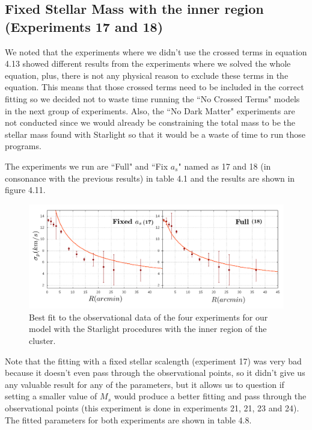 \subsection{Fixed Stellar Mass with the inner region (Experiments 17 and 18)}

We noted that the experiments where we didn't use the crossed terms in equation 4.13 showed different results from the experiments where we solved the whole equation, plus, there is not any physical reason to exclude these terms in the equation. This means that those crossed terms need to be included in the correct fitting so we decided not to waste time running the ``No Crossed Terms" models in the next group of experiments. Also, the ``No Dark Matter" experiments are not conducted since we would already be constraining the total mass to be the stellar mass found with Starlight so that it would be a waste of time to run those programs.

The experiments we run are ``Full" and ``Fix $a_s$" named as 17 and 18 (in consonance with the previous results) in table 4.1 and the results are shown in figure 4.11.

\begin{figure}[H]
\centering
\includegraphics[width=15cm]{images/Starlight_2.png}
\caption[Best fit of our model with the mass found with the Starlight procedures with the inner region]{Best fit to the observational data of the four experiments for our model with the Starlight procedures with the inner region of the cluster.}
\end{figure}

Note that the fitting with a fixed stellar scalength (experiment 17) was very bad because it doesn't even pass through the observational points, so it didn't give us any valuable result for any of the parameters, but it allows us to question if setting a smaller value of $M_s$ would produce a better fitting and pass through the observational points (this experiment is done in experiments 21, 21, 23 and 24). The fitted parameters for both experiments are shown in table 4.8. 

